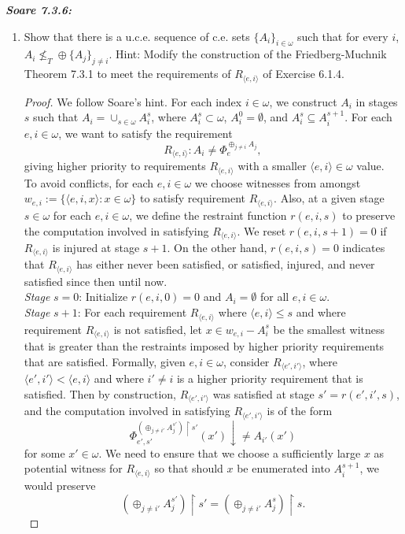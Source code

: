 \documentclass{article}
\begin{document}
\it \textbf{Soare 7.3.6:}
  \begin{enumerate}[label={(\roman*)}]
    \item Show that there is a u.c.e. sequence of c.e. sets
      $\{A_i\}_{i\in\omega}$ such that for every $i$, $A_i\not\leq_T \oplus
      \{A_j\}_{j\neq i}$. Hint: Modify the construction of the
      Friedberg-Muchnik Theorem 7.3.1 to meet the requirements of
      $R_{\langle e,i\rangle}$ of Exercise 6.1.4.

      \begin{proof}
        We follow Soare's hint. For each index $i\in\omega$, we construct
        $A_i$ in stages $s$ such that $A_i=\cup_{s\in\omega}A_i^s$, where
        $A_i^s\subset\omega$, $A_i^0=\emptyset$, and $A_i^s\subseteq
        A_i^{s+1}$. For each $e,i\in\omega$, we want to satisfy the
        requirement \[R_{\langle e,i\rangle}: A_i\neq\Phi_e^{\oplus_{j\neq
        i}A_j},\] giving higher priority to requirements $R_{\langle
        e,i\rangle}$ with a smaller $\langle e,i\rangle\in\omega$ value. \\

        To avoid conflicts, for each $e,i\in\omega$ we choose witnesses
        from amongst $w_{e,i}:=\{\langle e,i,x\rangle: x\in\omega\}$ to
        satisfy requirement $R_{\langle e,i\rangle}$. Also, at a given
        stage $s\in\omega$ for each $e,i\in\omega$, we define the restraint
        function $r(e,i,s)$ to preserve the computation involved in
        satisfying $R_{\langle e,i\rangle}$. We reset $r(e,i,s+1)=0$ if
        $R_{\langle e,i\rangle}$ is injured at stage $s+1$. On the other
        hand, $r(e,i,s)=0$ indicates that $R_{\langle e,i\rangle}$ has
        either never been satisfied, or satisfied, injured, and never
        satisfied since then until now. \\

        \textit{Stage} $s=0$: Initialize $r(e,i,0)=0$ and $A_i=\emptyset$
        for all $e,i\in\omega$. \\

        \textit{Stage} $s+1$: For each requirement $R_{\langle e,i\rangle}$
        where $\langle e,i\rangle \leq s$ and where requirement $R_{\langle
        e,i\rangle}$ is not satisfied, let $x\in w_{e,i}-A_i^s$ be the
        smallest witness that is greater than the restraints imposed by
        higher priority requirements that are satisfied. Formally,
        given $e,i\in\omega$, consider $R_{\langle e',i'\rangle}$, where
        $\langle e',i'\rangle <\langle e,i\rangle$ and where $i'\neq i$ is
        a higher priority requirement that is satisfied. Then by
        construction, $R_{\langle e',i'\rangle}$
        was satisfied at stage $s'=r(e',i',s)$, and the computation
        involved in satisfying $R_{\langle e',i'\rangle}$ is of the form
        \[\Phi_{e',s'}^{(\oplus_{j\neq i'} A_{j}^{s'}) \restriction s'}
        (x')\downarrow\neq A_{i'}(x')\]
        for some $x'\in\omega$. We need to ensure that we choose a
        sufficiently large $x$ as potential witness for $R_{\langle
        e,i\rangle}$ so that should $x$ be enumerated into $A_i^{s+1}$, we
        would preserve
        \[(\oplus_{j\neq i'} A_{j}^{s'}) \restriction s' =(\oplus_{j\neq
        i'} A_{j}^{s}) \restriction s.\]


\end{proof}
\end{enumerate}
\end{document}
